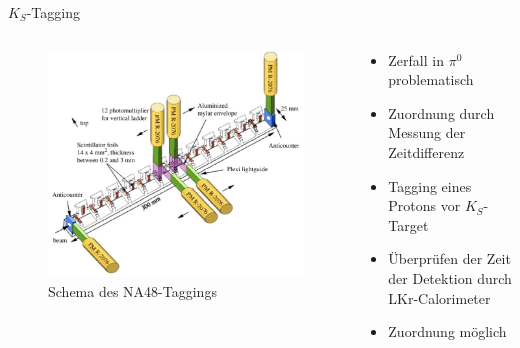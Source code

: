 \documentclass[aspectratio=1610, professionalfonts, 9pt, t]{beamer}
\begin{document}
  \begin{frame}{$K_S$-Tagging}
    \begin{columns}[onlytextwidth]
      \begin{column}{0.4\textwidth}
        \begin{figure}[ht]
          \vspace*{-1cm}
          \begin{center}
            \includegraphics[height=0.8\textheight]{Images/na48strangetag.png} %
            \caption{Schema des NA48-Taggings}
          \end{center}
        \end{figure}
      \end{column}
      \begin{column}{0.5\textwidth}
        \begin{itemize}
          \item Zerfall in $\pi^0$ problematisch
          \item Zuordnung durch Messung der Zeitdifferenz
          \item Tagging eines Protons vor $K_S$-Target
          \item Überprüfen der Zeit der Detektion durch LKr-Calorimeter
          \item[\rightarrow] Zuordnung möglich
        \end{itemize}
      \end{column}
    \end{columns}
  \end{frame}
\end{document}
